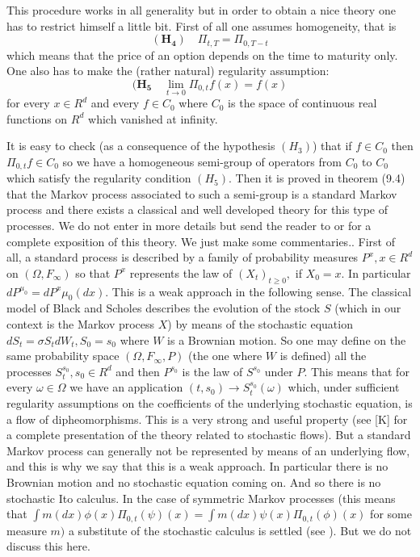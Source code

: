 \documentclass[a4paper]{article}
\begin{document}
This procedure works in all generality but in order to obtain a nice theory
one has to restrict himself a little bit. First of all one assumes
homogeneity, that is
\[
\mathbf{(H_{4})}\quad \Pi _{t,T}=\Pi _{0,T-t}
\]
which means that the price of an option depends on the time to maturity
only. One also has to make the (rather natural) regularity assumption:
\[
\mathbf{(H_{5}}\quad \lim_{t\rightarrow 0}\Pi _{0,t}f(x)=f(x)
\]
for every $x\in R^{d}$ and every $f\in C_{0}$ where $C_{0}$ is the space of
continuous real functions on $R^{d}$ which vanished at infinity.

It is easy to check (as a consequence of the hypothesis $(H_{3})$) that if $%
f\in C_{0}$ then $\Pi _{0,t}f\in C_{0}$ so we have a homogeneous semi-group
of operators from $C_{0}$ to $C_{0}$ which satisfy the regularity condition $%
(H_{5}).$ Then it is proved in \cite{BG} theorem (9.4) that the Markov process
associated to such a semi-group is a standard Markov process and there exists
a classical and well developed theory for this type of processes. We do not
enter in more details but send the reader to \cite{BG} or \cite{S} for a complete
exposition of this theory. We just make some commentaries.. First of all, a
standard process is described by a family of probability measures $%
P^{x},x\in R^{d}$ on $(\Omega ,F_{\infty })$ so that $P^{x}$ represents the
law of $(X_{t})_{t\geq 0},$ if $X_{0}=x.$ In particular $dP^{\mu
_{0}}=dP^{x}\mu _{0}(dx).$ This is a weak approach in the following sense.
The classical model of Black and Scholes describes the evolution of the
stock $S$ (which in our context is the Markov process $X$) by means of the
stochastic equation $dS_{t}=\sigma S_{t}dW_{t},S_{0}=s_{0}$ where $W$ is a
Brownian motion. So one may define on the same probability space $(\Omega
,F_{\infty },P)$ (the one where $W$ is defined) all the processes $
S_{t}^{s_{0}},s_{0}\in R^{d}$ and then $P^{s_{0}}$ is the law of $%
S^{s_{0}}$ under $P.$ This means that for every $\omega \in \Omega
$ we have an application $(t,s_{0})\rightarrow
S_{t}^{s_{0}}(\omega )$ which, under sufficient regularity
assumptions on the coefficients of the underlying stochastic
equation, is a flow of dipheomorphisms. This is a very strong and
useful property (see [K] for a complete presentation of the theory
related to stochastic flows). But a standard Markov process can
generally not be represented by means of an underlying flow, and
this is why we say that this is a weak approach. In particular
there is no Brownian motion and no stochastic equation coming on.
And so there is no stochastic Ito calculus.  In the case of
symmetric Markov processes (this means that $\int m(dx)\phi (x)\Pi
_{0,t}(\psi )(x)=\int m(dx)\psi (x)\Pi _{0,t}(\phi )(x)$ for some
measure $m)$ a substitute of the stochastic calculus is settled
(see \cite{F}).  But we do not discuss this here.
\end{document}
